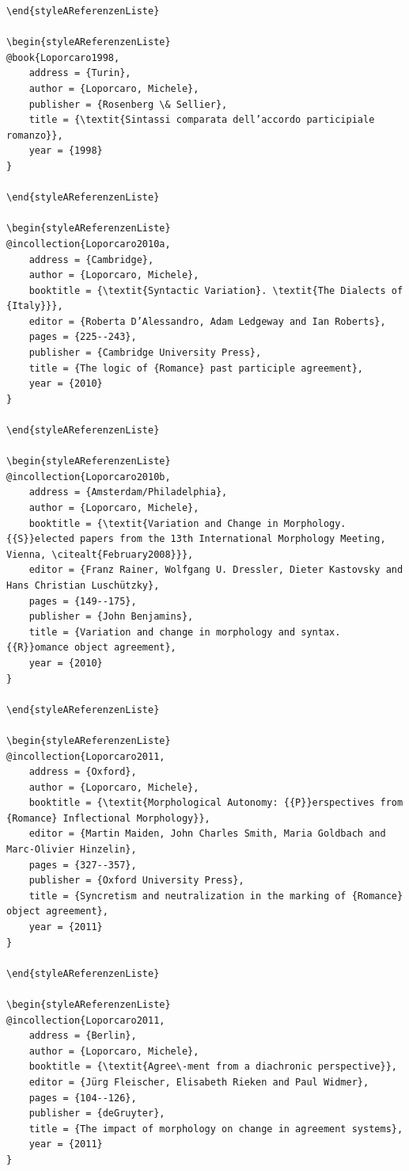 \documentclass[output=paper]{langscibook}
\begin{document}
\begin{styleBiblio}
\begin{verbatim}
\end{styleAReferenzenListe}

\begin{styleAReferenzenListe}
@book{Loporcaro1998,
	address = {Turin},
	author = {Loporcaro, Michele},
	publisher = {Rosenberg \& Sellier},
	title = {\textit{Sintassi comparata dell’accordo participiale romanzo}},
	year = {1998}
}

\end{styleAReferenzenListe}

\begin{styleAReferenzenListe}
@incollection{Loporcaro2010a,
	address = {Cambridge},
	author = {Loporcaro, Michele},
	booktitle = {\textit{Syntactic Variation}. \textit{The Dialects of {Italy}}},
	editor = {Roberta D’Alessandro, Adam Ledgeway and Ian Roberts},
	pages = {225--243},
	publisher = {Cambridge University Press},
	title = {The logic of {Romance} past participle agreement},
	year = {2010}
}

\end{styleAReferenzenListe}

\begin{styleAReferenzenListe}
@incollection{Loporcaro2010b,
	address = {Amsterdam/Philadelphia},
	author = {Loporcaro, Michele},
	booktitle = {\textit{Variation and Change in Morphology. {{S}}elected papers from the 13th International Morphology Meeting, Vienna, \citealt{February2008}}},
	editor = {Franz Rainer, Wolfgang U. Dressler, Dieter Kastovsky and Hans Christian Luschützky},
	pages = {149--175},
	publisher = {John Benjamins},
	title = {Variation and change in morphology and syntax. {{R}}omance object agreement},
	year = {2010}
}

\end{styleAReferenzenListe}

\begin{styleAReferenzenListe}
@incollection{Loporcaro2011,
	address = {Oxford},
	author = {Loporcaro, Michele},
	booktitle = {\textit{Morphological Autonomy: {{P}}erspectives from {Romance} Inflectional Morphology}},
	editor = {Martin Maiden, John Charles Smith, Maria Goldbach and Marc-Olivier Hinzelin},
	pages = {327--357},
	publisher = {Oxford University Press},
	title = {Syncretism and neutralization in the marking of {Romance} object agreement},
	year = {2011}
}

\end{styleAReferenzenListe}

\begin{styleAReferenzenListe}
@incollection{Loporcaro2011,
	address = {Berlin},
	author = {Loporcaro, Michele},
	booktitle = {\textit{Agree\-ment from a diachronic perspective}},
	editor = {Jürg Fleischer, Elisabeth Rieken and Paul Widmer},
	pages = {104--126},
	publisher = {deGruyter},
	title = {The impact of morphology on change in agreement systems},
	year = {2011}
}


\end{verbatim}
\end{styleBiblio}
\end{document}
